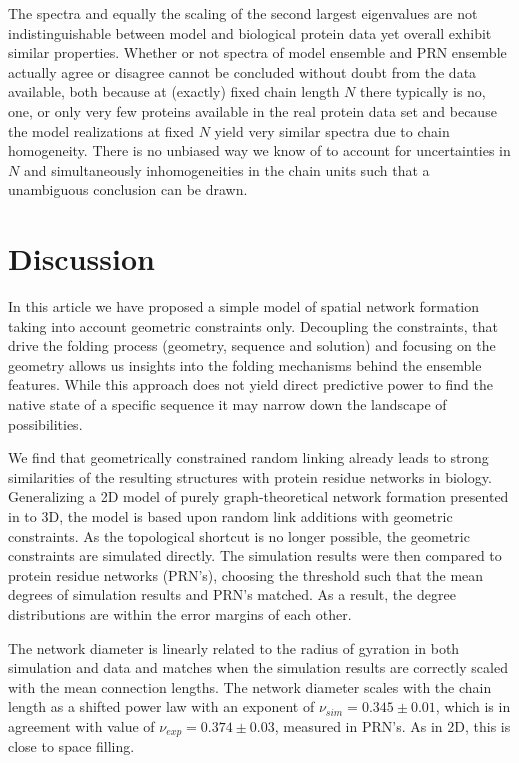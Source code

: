 \documentclass[9pt]{elife}
\begin{document}
The spectra and equally the scaling of the second largest eigenvalues are not indistinguishable between model and biological protein data yet overall exhibit similar properties. Whether or not spectra of model ensemble and PRN ensemble actually agree or disagree cannot be concluded without doubt from the data available, both because at (exactly) fixed chain length $N$ there typically is no, one, or only very few proteins available in the real protein data set and because the model realizations at fixed $N$ yield very similar spectra due to chain homogeneity. There is no unbiased way we know of to account for uncertainties in $N$ and simultaneously inhomogeneities in the chain units such that a unambiguous conclusion can be drawn.

\section{Discussion}
In this article we have proposed a simple model of spatial network formation taking into account geometric constraints only. 
Decoupling the constraints, that drive the folding process (geometry, sequence and solution) and focusing on the geometry allows us insights into the folding mechanisms behind the ensemble features. While this approach does not yield direct predictive power to find the native state of a specific sequence it may narrow down the landscape of possibilities.

We find that geometrically constrained random linking already leads to strong similarities of the resulting structures with protein residue networks in biology.
Generalizing a 2D model of purely graph-theoretical network formation presented in \cite{molkenthin2016scaling} to 3D, the model is based upon random link additions with geometric constraints. As the topological shortcut is no longer possible, the geometric constraints are simulated directly. The simulation results were then compared to protein residue networks (PRN's), choosing the threshold such that the mean degrees of simulation results and PRN's matched. As a result, the degree distributions are within the error margins of each other.

The network diameter is linearly related to the radius of gyration in both simulation and data and matches when the simulation results are correctly scaled with the mean connection lengths. The network diameter scales with the chain length as a shifted power law with an exponent of $\nu_{sim}=0.345 \pm 0.01$, which is in agreement with value of $\nu_{exp}=0.374 \pm 0.03$, measured in PRN's. As in 2D, this is close to space filling.
\end{document}
